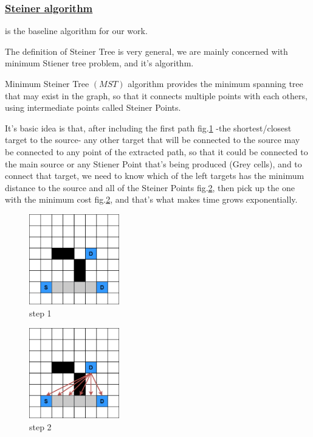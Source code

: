     \subsubsection{\underline{Steiner algorithm}}
    \label{SteinerSection}
    is the baseline algorithm for our work.

    The definition of Steiner Tree is very general, we are mainly concerned with minimum Stiener tree problem,
    and it's algorithm.

    Minimum Steiner Tree $(MST)$ algorithm provides the minimum spanning tree that may exist in the graph,
    so that it connects multiple points with each others, using intermediate points called Steiner Points.

    It's basic idea is that, after including the first path fig.\ref{fig:steiner_1} -the shortest/closest target to the source-
    any other target that will be connected to the source may be connected to any point of the 
    extracted path, so that it could be connected to the main source or any Stiener Point that's being produced (Grey cells),
    and to connect that target, we need to know which of the left targets has the minimum distance to the source
    and all of the Steiner Points fig.\ref{fig:steiner_2}, then pick up the one with the minimum cost fig.\ref{fig:steiner_2},
    and that's what makes time grows exponentially.

    \begin{figure}[H]
        \centering
        \includegraphics[width=0.35\textwidth]{figures/Steiner Stages/steiner_1.png}
        \caption{step 1}
        \label{fig:steiner_1}
    \end{figure}

    \begin{figure}[H]
        \centering
        \includegraphics[width=0.35\textwidth]{figures/Steiner Stages/steiner_2.png}
        \caption{step 2}
        \label{fig:steiner_2}
    \end{figure}

